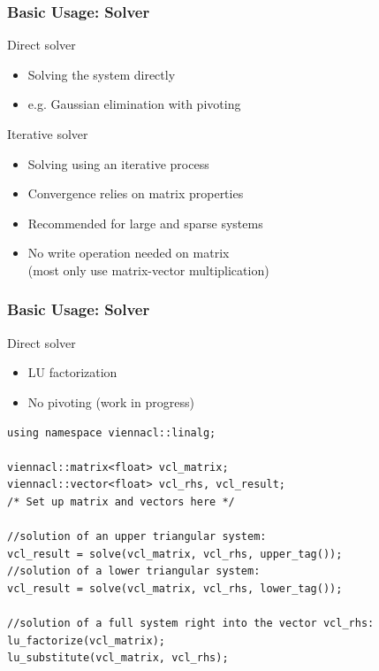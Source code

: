 \begin{frame}
\frametitle{Basic Usage: Solver}

\begin{block}{Direct solver}
  \begin{itemize}
   \item Solving the system directly
   \item e.g. Gaussian elimination with pivoting
  \end{itemize}
\end{block}

\begin{block}{Iterative solver}
  \begin{itemize}
   \item Solving using an iterative process
   \item Convergence relies on matrix properties
   \item Recommended for large and sparse systems
   \item No write operation needed on matrix\\(most only use matrix-vector multiplication)
  \end{itemize}
\end{block}

\end{frame}



\begin{frame}[fragile]
\frametitle{Basic Usage: Solver}

\begin{block}{Direct solver}
  \begin{itemize}
   \item LU factorization
   \item No pivoting (work in progress)
  \end{itemize}
  
  \begin{lstlisting}
using namespace viennacl::linalg;

viennacl::matrix<float> vcl_matrix;
viennacl::vector<float> vcl_rhs, vcl_result;
/* Set up matrix and vectors here */

//solution of an upper triangular system:
vcl_result = solve(vcl_matrix, vcl_rhs, upper_tag());
//solution of a lower triangular system:
vcl_result = solve(vcl_matrix, vcl_rhs, lower_tag());

//solution of a full system right into the vector vcl_rhs:
lu_factorize(vcl_matrix);
lu_substitute(vcl_matrix, vcl_rhs);
  \end{lstlisting}
\end{block}

\end{frame}



